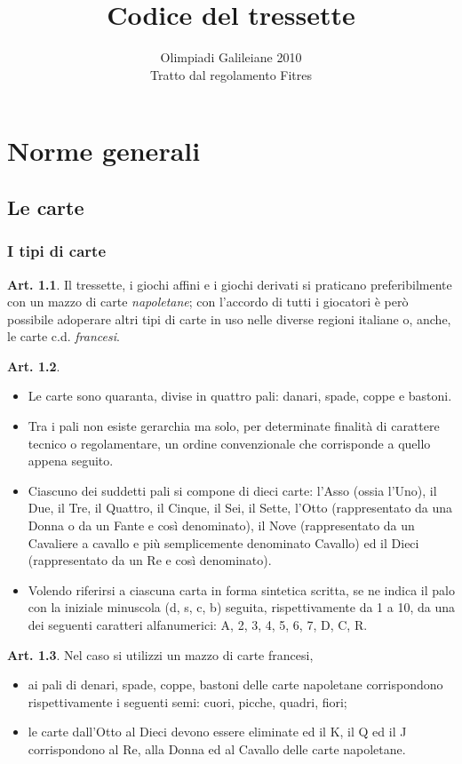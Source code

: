 \documentclass[italian,a4paper]{book}
\title{Codice del tressette}
\author{Olimpiadi Galileiane 2010\\
\small{Tratto dal regolamento Fitres}}
\date{}
\theoremstyle{definition}
\newtheorem{art}{Art.}
\newenvironment{packeditem}{
\begin{itemize}
  \setlength{\itemsep}{1pt}
  \setlength{\parskip}{0pt}
  \setlength{\parsep}{0pt}
}{\end{itemize}}
\begin{document}
\maketitle
\chapter{Norme generali}
\section{Le carte}
\subsection{I tipi di carte}
\begin{art}
    Il tressette, i giochi affini e i giochi derivati  si praticano preferibilmente con un mazzo di carte \emph{napoletane}; con l'accordo di tutti i giocatori è però possibile adoperare altri tipi di carte in uso nelle diverse regioni italiane o, anche, le carte c.d. \emph{francesi}.
\end{art}
\begin{art} \hspace*{\fill}
    \begin{packeditem}
\item Le carte sono quaranta, divise in quattro pali: danari, spade, coppe e bastoni.
\item Tra i pali non esiste gerarchia ma solo, per determinate finalità di carattere tecnico o regolamentare, un ordine convenzionale che corrisponde a quello appena seguito.
\item Ciascuno dei suddetti pali si compone di dieci carte: l'Asso (ossia l'Uno), il Due, il Tre, il Quattro, il Cinque, il Sei, il Sette, l'Otto (rappresentato da una Donna o da un Fante e così denominato), il Nove (rappresentato da un Cavaliere a  cavallo e più semplicemente denominato Cavallo) ed il Dieci (rappresentato da un Re e così denominato).
\item Volendo riferirsi a ciascuna carta in forma sintetica scritta, se ne
    indica il palo con la iniziale minuscola (d, s, c, b) seguita,
    rispettivamente da 1 a 10, da una dei seguenti caratteri alfanumerici: A, 2,
    3, 4, 5, 6, 7, D, C, R.
    \end{packeditem}
\end{art}
\begin{art}
    Nel caso si utilizzi un mazzo di carte francesi,
    \begin{packeditem}
\item   ai pali di denari, spade, coppe, bastoni delle carte napoletane corrispondono rispettivamente i seguenti semi: cuori, picche, quadri, fiori;
\item   le carte dall'Otto al Dieci devono essere eliminate ed il K, il Q ed il J corrispondono al Re, alla Donna ed al Cavallo delle carte napoletane.
    \end{packeditem}
\end{art}
\end{document}
